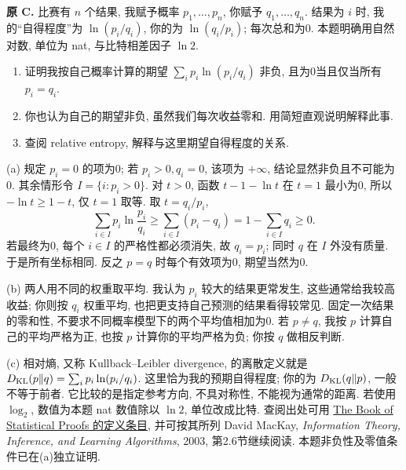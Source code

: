\begin{exercise}\label{ex:P10.C}
\textbf{原 C.} 比赛有 $n$ 个结果, 我赋予概率 $p_1,\ldots,p_n$, 你赋予 $q_1,\ldots,q_n$. 结果为 $i$ 时, 我的“自得程度”为 $\ln(p_i/q_i)$, 你的为 $\ln(q_i/p_i)$; 每次总和为0. 本题明确用自然对数, 单位为 nat, 与比特相差因子 $\ln2$.
\begin{enumerate}[label=(\alph*)]
\item\label{part:P10.C.a} 证明我按自己概率计算的期望 $\sum_i p_i\ln(p_i/q_i)$ 非负, 且为0当且仅当所有 $p_i=q_i$.
\item\label{part:P10.C.b} 你也认为自己的期望非负, 虽然我们每次收益零和. 用简短直观说明解释此事.
\item\label{part:P10.C.c} 查阅 relative entropy, 解释与这里期望自得程度的关系.
\end{enumerate}
\end{exercise}
\begin{solution}\label{sol:P10.C}
(a) 规定 $p_i=0$ 的项为0; 若 $p_i>0,q_i=0$, 该项为 $+\infty$, 结论显然非负且不可能为0. 其余情形令 $I=\{i:p_i>0\}$. 对 $t>0$, 函数 $t-1-\ln t$ 在 $t=1$ 最小为0, 所以 $-\ln t\ge1-t$, 仅 $t=1$ 取等. 取 $t=q_i/p_i$,
\[
 \sum_{i\in I}p_i\ln\frac{p_i}{q_i}
 \ge\sum_{i\in I}(p_i-q_i)
 =1-\sum_{i\in I}q_i\ge0.
\]
若最终为0, 每个 $i\in I$ 的严格性都必须消失, 故 $q_i=p_i$; 同时 $q$ 在 $I$ 外没有质量. 于是所有坐标相同. 反之 $p=q$ 时每个有效项为0, 期望当然为0.

(b) 两人用不同的权重取平均. 我认为 $p_i$ 较大的结果更常发生, 这些通常给我较高收益; 你则按 $q_i$ 权重平均, 也把更支持自己预测的结果看得较常见. 固定一次结果的零和性, 不要求不同概率模型下的两个平均值相加为0. 若 $p\ne q$, 我按 $p$ 计算自己的平均严格为正, 也按 $p$ 计算你的平均严格为负; 你按 $q$ 做相反判断.

(c) 相对熵, 又称 Kullback--Leibler divergence, 的离散定义就是 $D_{\rm KL}(p\Vert q)=\sum_i p_i\ln(p_i/q_i)$. 这里恰为我的预期自得程度; 你的为 $D_{\rm KL}(q\Vert p)$, 一般不等于前者. 它比较的是指定参考方向, 不具对称性, 不能视为通常的距离. 若使用 $\log_2$, 数值为本题 nat 数值除以 $\ln2$, 单位改成比特. 查阅出处可用 \href{https://statproofbook.github.io/D/kl.html}{The Book of Statistical Proofs 的定义条目}, 并可按其所列 David MacKay, \textit{Information Theory, Inference, and Learning Algorithms}, 2003, 第2.6节继续阅读. 本题非负性及零值条件已在(a)独立证明.
\end{solution}

